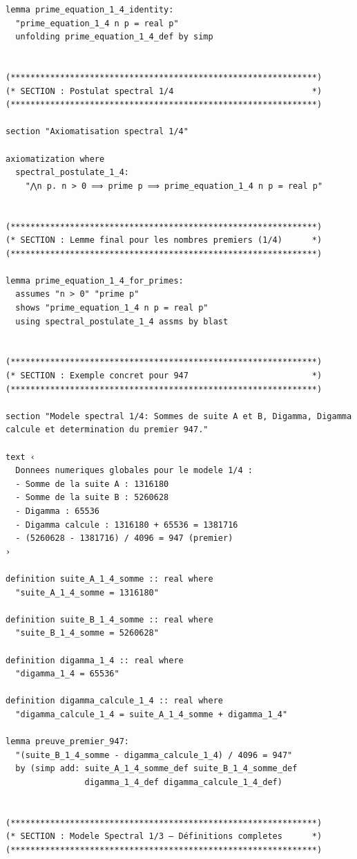 \documentclass[a4paper,11pt]{article}
\begin{document}
\begin{holcode}[title={\textcolor{white}{File: methode\_spectral.thy -- Part 1/4}}]
\begin{lstlisting}
lemma prime_equation_1_4_identity:
  "prime_equation_1_4 n p = real p"
  unfolding prime_equation_1_4_def by simp


(**************************************************************)
(* SECTION : Postulat spectral 1/4                            *)
(**************************************************************)

section "Axiomatisation spectral 1/4"

axiomatization where
  spectral_postulate_1_4:
    "⋀n p. n > 0 ⟹ prime p ⟹ prime_equation_1_4 n p = real p"


(**************************************************************)
(* SECTION : Lemme final pour les nombres premiers (1/4)      *)
(**************************************************************)

lemma prime_equation_1_4_for_primes:
  assumes "n > 0" "prime p"
  shows "prime_equation_1_4 n p = real p"
  using spectral_postulate_1_4 assms by blast


(**************************************************************)
(* SECTION : Exemple concret pour 947                         *)
(**************************************************************)

section "Modele spectral 1/4: Sommes de suite A et B, Digamma, Digamma calcule et determination du premier 947."

text ‹
  Donnees numeriques globales pour le modele 1/4 :
  - Somme de la suite A : 1316180
  - Somme de la suite B : 5260628
  - Digamma : 65536
  - Digamma calcule : 1316180 + 65536 = 1381716
  - (5260628 - 1381716) / 4096 = 947 (premier)
›

definition suite_A_1_4_somme :: real where
  "suite_A_1_4_somme = 1316180"

definition suite_B_1_4_somme :: real where
  "suite_B_1_4_somme = 5260628"

definition digamma_1_4 :: real where
  "digamma_1_4 = 65536"

definition digamma_calcule_1_4 :: real where
  "digamma_calcule_1_4 = suite_A_1_4_somme + digamma_1_4"

lemma preuve_premier_947:
  "(suite_B_1_4_somme - digamma_calcule_1_4) / 4096 = 947"
  by (simp add: suite_A_1_4_somme_def suite_B_1_4_somme_def
                digamma_1_4_def digamma_calcule_1_4_def)


(**************************************************************)
(* SECTION : Modele Spectral 1/3 – Définitions completes      *)
(**************************************************************)


\end{lstlisting}
\end{holcode}
\end{document}
